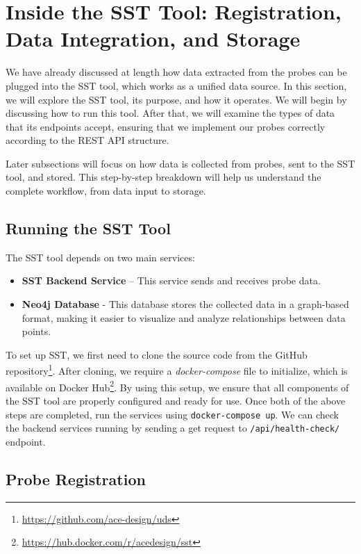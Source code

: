 \section{Inside the SST Tool: Registration, Data Integration, and Storage}\label{sec:sst_tool}

We have already discussed at length how data extracted from the probes can be plugged into the SST tool, which works as a unified data source. In this section, we will explore the SST tool, its purpose, and how it operates. We will begin by discussing how to run this tool. After that, we will examine the types of data that its endpoints accept, ensuring that we implement our probes correctly according to the REST API structure.

Later subsections will focus on how data is collected from probes, sent to the SST tool, and stored. This step-by-step breakdown will help us understand the complete workflow, from data input to storage.

\subsection{Running the SST Tool}

The SST tool depends on two main services:  
\begin{itemize}
    \item \textbf{SST Backend Service} – This service sends and receives probe data.
    \item \textbf{Neo4j Database} - This database stores the collected data in a graph-based format, making it easier to visualize and analyze relationships between data points.
\end{itemize}

To set up SST, we first need to clone the source code from the GitHub repository\footnote{\url{https://github.com/ace-design/uds}}. After cloning, we require a \textit{docker-compose} file to initialize, which is available on Docker Hub\footnote{\url{https://hub.docker.com/r/acedesign/sst}}. By using this setup, we ensure that all components of the SST tool are properly configured and ready for use.
\sloppy
Once both of the above steps are completed, run the services using \texttt{docker-compose up}. We can check the backend services running by sending a get request to \texttt{/api/health-check/} endpoint.
\fussy

\subsection{Probe Registration}

